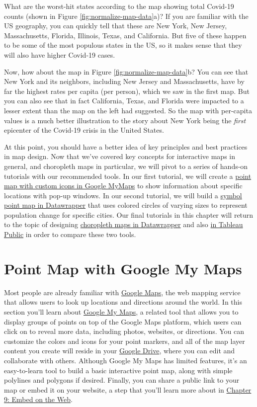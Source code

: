 \documentclass[
  english,
]{book}
\begin{document}
What are the worst-hit states according to the map showing total Covid-19 counts (shown in Figure \ref{fig:normalize-map-data}a)? If you are familiar with the US geography, you can quickly tell that these are New York, New Jersey, Massachusetts, Florida, Illinois, Texas, and California. But five of these happen to be some of the most populous states in the US, so it makes sense that they will also have higher Covid-19 cases.

Now, how about the map in Figure \ref{fig:normalize-map-data}b? You can see that New York and its neighbors, including New Jersey and Massachusetts, have by far the highest rates per capita (per person), which we saw in the first map. But you can also see that in fact California, Texas, and Florida were impacted to a lesser extent than the map on the left had suggested. So the map with per-capita values is a much better illustration to the story about New York being the \emph{first} epicenter of the Covid-19 crisis in the United States.

At this point, you should have a better idea of key principles and best practices in map design. Now that we've covered key concepts for interactive maps in general, and choropleth maps in particular, we will pivot to a series of hands-on tutorials with our recommended tools. In our first tutorial, we will create a \href{mymaps.html}{point map with custom icons in Google MyMaps} to show information about specific locations with pop-up windows. In our second tutorial, we will build a \href{symbolmap-datawrapper.html}{symbol point map in Datawrapper} that uses colored circles of varying sizes to represent population change for specific cities. Our final tutorials in this chapter will return to the topic of designing \href{choropleth-datawrapper.html}{choropleth maps in Datawrapper} and also \href{map-tableau.html}{in Tableau Public} in order to compare these two tools.

\hypertarget{mymaps}{%
\section*{Point Map with Google My Maps}\label{mymaps}}

Most people are already familiar with \href{https://www.google.com/maps/}{Google Maps}, the web mapping service that allows users to look up locations and directions around the world. In this section you'll learn about \href{https://www.google.com/maps/about/mymaps/}{Google My Maps}, a related tool that allows you to display groups of points on top of the Google Maps platform, which users can click on to reveal more data, including photos, websites, or directions. You can customize the colors and icons for your point markers, and all of the map layer content you create will reside in your \href{https://drive.google.com}{Google Drive}, where you can edit and collaborate with others. Although Google My Maps has limited features, it's an easy-to-learn tool to build a basic interactive point map, along with simple polylines and polygons if desired. Finally, you can share a public link to your map or embed it on your website, a step that you'll learn more about in \href{embed.html}{Chapter 9: Embed on the Web}.
\end{document}
